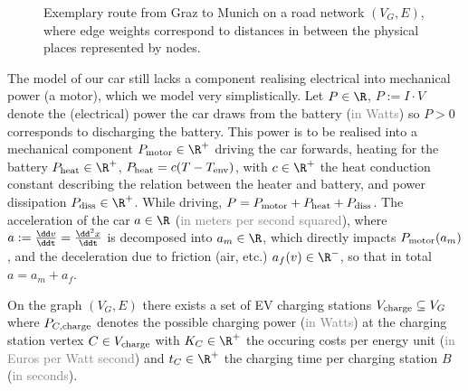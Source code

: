 \documentclass{prettytex/ox/mmsc-special-topic}
\begin{document}
  \begin{figure}[H]
    \centering
    \caption{Exemplary route from Graz to Munich on a road network $(V_G, E)$, where edge weights correspond to distances in between the physical places represented by nodes.}
    \label{fig:graz-to-munich}
  \end{figure}

  The model of our car still lacks a component realising electrical into mechanical power (a motor), which we model very simplistically.
  Let $P \in \R$, $P := I \cdot V$ denote the (electrical) power the car draws from the battery (\textcolor{gray}{in Watts}) so $P > 0$ corresponds to discharging the battery.
  This power is to be realised into a mechanical component $P_{\rm motor} \in \R^+$ driving the car forwards, heating for the battery $P_{\rm heat} \in \R^+$, $P_{\rm heat} = c (T - T_{\rm env})$, with $c \in \R^+$ the heat conduction constant describing the relation between the heater and battery, and power dissipation $P_{\rm diss} \in \R^+$.
  While driving, $P = P_{\rm motor} + P_{\rm heat} + P_{\rm diss}$.
  The acceleration of the car $a \in \R$ (\textcolor{gray}{in meters per second squared}), where $a := \frac{\dd v}{\ddt} = \frac{\dd^2 x}{\ddt}$ is decomposed into $a_m \in \R$, which directly impacts $P_{\rm motor}(a_m)$, and the deceleration due to friction (air, etc.) $a_f(v) \in \R^-$, so that in total $a = a_m + a_f$.

  On the graph $(V_G, E)$ there exists a set of EV charging stations $V_{\rm charge} \subseteq V_G$ where $P_{C,\rm charge}$ denotes the possible charging power (\textcolor{gray}{in Watts}) at the charging station vertex $C \in V_{\rm charge}$ with $K_C \in \R^+$ the occuring costs per energy unit (\textcolor{gray}{in Euros per Watt second}) and $t_C \in \R^+$ the charging time per charging station $B$ (\textcolor{gray}{in seconds}).
\end{document}
